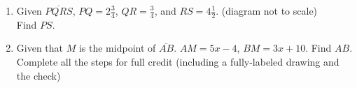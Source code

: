 \documentclass[12pt, twoside]{article}
\begin{document}
\begin{enumerate}
\item Given $\overline{PQRS}$, $PQ=2 \frac{3}{4}$, $QR=\frac{3}{4}$, and $RS= 4 \frac{1}{2}$. (diagram not to scale)\\ [0.25cm]
  Find ${PS}$.\\[.5in]
      \vspace{3cm}

\item Given that $M$ is the midpoint of $\overline{AB}$. $AM=5x-4$, $BM=3x+10$. Find ${AB}$.\\
Complete all the steps for full credit (including a fully-labeled drawing and the check)

\end{enumerate}
\end{document}

